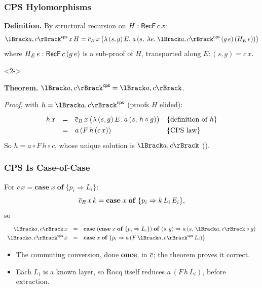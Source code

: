 \begin{frame}[vertical-alignment = top]
  \frametitle{CPS Hylomorphisms}
  \vspace*{4mm}
  \textbf{Definition.} By structural recursion on $H :
  \mathsf{RecF}\,c\,x$:
  \[ \hylo{a}{c}^{\mathsf{cps}}\,x\,H = \cps{c}_B\,x\,\bigl(\lambda\,(s,
     g)\,E.\; a\,(s,\; \lambda e.\; \hylo{a}{c}^{\mathsf{cps}}\,(g\,e)\,
     (H_E\,e))\bigr) \]
  where $H_E\,e : \mathsf{RecF}\,c\,(g\,e)$ is a sub-proof of $H$, transported
  along $E : (s, g) = c\,x$.
  \begin{uncoverenv}<2->
    \par\medskip
    \textbf{Theorem.} $\hylo{a}{c}^{\mathsf{cps}} = \hylo{a}{c}$.
    \par\smallskip
    \emph{Proof}, with $h = \hylo{a}{c}^{\mathsf{cps}}$ (proofs $H$
    elided):
    \[
      \begin{array}{rcll}
        h\,x & = & \cps{c}_B\,x\,\bigl(\lambda\,(s, g)\,E.\; a\,(s,\, h
          \circ g)\bigr) & \{\text{definition of } h\} \\
        & = & a\,(F\,h\,(c\,x)) & \{\text{CPS law}\}
      \end{array}
    \]
    So $h = a \circ F\,h \circ c$, whose unique solution is $\hylo{a}{c}$
    ().
  \end{uncoverenv}
\end{frame}

\begin{frame}[vertical-alignment = top]
  \frametitle{CPS Is Case-of-Case}
  \vspace*{4mm}
  For $c\,x = \mathbf{case}\;x\;\mathbf{of}\;\{p_i \Rightarrow L_i\}$:
  \[ \overline{c}_R\,x\,k = \mathbf{case}\;x\;\mathbf{of}\;\{p_i \Rightarrow
     k\,L_i\,E_i\}, \]
  so
  \[
    \renewcommand\arraystretch{1.3}
    \begin{array}{rcl}
      \hylo{a}{c}\,x & = & \mathbf{case}\;(\mathbf{case}\;x\;\mathbf{of}\;
        \{p_i \Rightarrow L_i\})\;\mathbf{of}\;(s, g) \Rightarrow
        a\,(s,\, \hylo{a}{c} \circ g) \\
      \hylo{a}{c}^{\mathsf{cps}}\,x & = & \mathbf{case}\;x\;\mathbf{of}\;
        \{p_i \Rightarrow a\,(F\,\hylo{a}{c}^{\mathsf{cps}}\,L_i)\}
    \end{array}
  \]
  \begin{itemize}
    \item<2-> The commuting conversion, done \textbf{once}, in $\overline{c}$;
      the theorem proves it correct.
    \item<3-> Each $L_i$ is a known layer, so Rocq itself reduces
      $a\,(F\,h\,L_i)$, before extraction.
  \end{itemize}
\end{frame}

